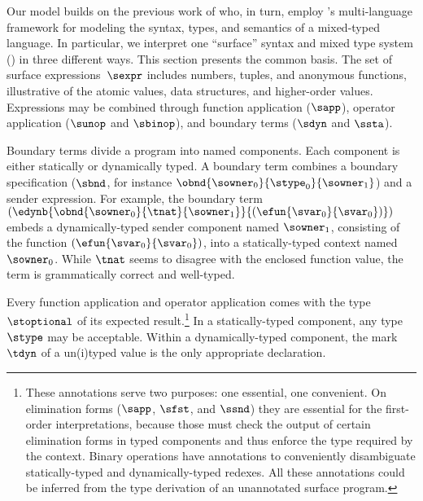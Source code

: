 \begin{figure}[t]
{\begin{mathpar}

  \end{mathpar}}

  \caption{\ssurfacelang{}}
  \label{fig:surface-language}
\vspace{-3mm}
\end{figure}

\noindent Our model builds on the previous work of
  who, in turn, employ
 's multi-language framework for modeling the syntax,
 types, and semantics of a mixed-typed language.
In particular, we interpret one ``surface'' syntax and mixed
 type system () in three different ways.  This
 section presents the common basis.
The set of surface expressions~$\sexpr$ includes numbers, tuples, and anonymous
 functions, illustrative of the atomic values, data structures, and higher-order values.
Expressions may be combined
 through function application ($\sapp$), operator application ($\sunop$ and
 $\sbinop$), and boundary terms ($\sdyn$ and $\ssta$).

Boundary terms divide a program into named components.
Each component is either statically or dynamically typed.
A boundary term combines a boundary specification ($\sbnd$, for instance
$\obnd{\sowner_0}{\stype_0}{\sowner_1}$) and a sender expression.
For example, the boundary term $(\edynb{\obnd{\sowner_0}{\tnat}{\sowner_1}}{(\efun{\svar_0}{\svar_0})})$
embeds a dynamically-typed sender component named $\sowner_1$,
consisting of the function $(\efun{\svar_0}{\svar_0})$,
into a statically-typed context named $\sowner_0$.
While $\tnat$ seems to disagree with the enclosed function value,
the term is grammatically correct and well-typed.

Every function application and operator application comes with the type
 $\stoptional$ of its expected result.\footnote{These annotations serve two
 purposes: one essential, one convenient. On elimination forms ($\sapp$,
 $\sfst$, and $\ssnd$) they are essential for the first-order
 interpretations, because those must check the output of certain
 elimination forms in typed components and thus enforce the type required
 by the context. Binary operations have annotations to conveniently
 disambiguate statically-typed and dynamically-typed redexes.
 All these annotations could
 be inferred from the type derivation of an unannotated surface program.}  In a
 statically-typed component, any type $\stype$ may be acceptable.  Within a
 dynamically-typed component, the mark $\tdyn$ of a un(i)typed value is the
 only appropriate declaration.

